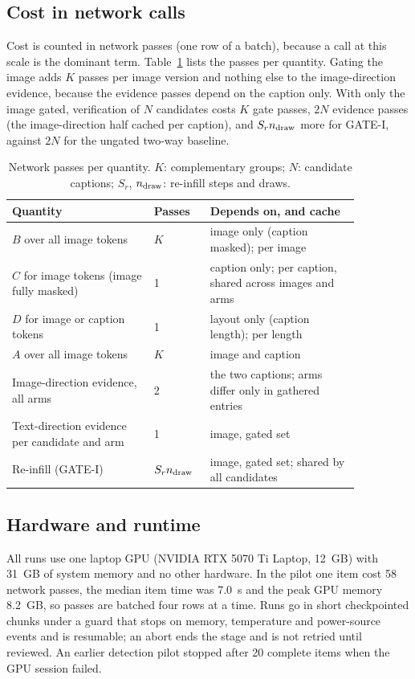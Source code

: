 \subsection{Cost in network calls}\label{app:cost}
Cost is counted in network passes (one row of a batch), because a call at this scale is the dominant term.
Table~\ref{tab:cost} lists the passes per quantity.
Gating the image adds $K$ passes per image version and nothing else to the image-direction evidence, because the evidence
passes depend on the caption only.
With only the image gated, verification of $N$ candidates costs $K$ gate passes, $2N$ evidence passes (the image-direction
half cached per caption), and $S_rn_{\rm draw}$ more for GATE-I, against $2N$ for the ungated two-way baseline.

\begin{table}[t]
\centering
\caption{Network passes per quantity. $K$: complementary groups; $N$: candidate captions; $S_r$, $n_{\rm draw}$: re-infill steps and draws.}
\label{tab:cost}
\small
\begin{tabular}{p{0.36\linewidth}p{0.12\linewidth}p{0.38\linewidth}}
\toprule
Quantity & Passes & Depends on, and cache \\
\midrule
$B$ over all image tokens & $K$ & image only (caption masked); per image \\
$C$ for image tokens (image fully masked) & 1 & caption only; per caption, shared across images and arms \\
$D$ for image or caption tokens & 1 & layout only (caption length); per length \\
$A$ over all image tokens & $K$ & image and caption \\
Image-direction evidence, all arms & 2 & the two captions; arms differ only in gathered entries \\
Text-direction evidence per candidate and arm & 1 & image, gated set \\
Re-infill (GATE-I) & $S_rn_{\rm draw}$ & image, gated set; shared by all candidates \\
\bottomrule
\end{tabular}
\end{table}

\subsection{Hardware and runtime}\label{app:hardware}
All runs use one laptop GPU (NVIDIA RTX 5070 Ti Laptop, 12~GB) with 31~GB of system memory and no other hardware.
In the pilot one item cost 58 network passes, the median item time was 7.0~s and the peak GPU memory 8.2~GB, so passes are batched
four rows at a time.
Runs go in short checkpointed chunks under a guard that stops on memory, temperature and power-source events and is resumable; an
abort ends the stage and is not retried until reviewed.
An earlier detection pilot stopped after 20 complete items when the GPU session failed.

